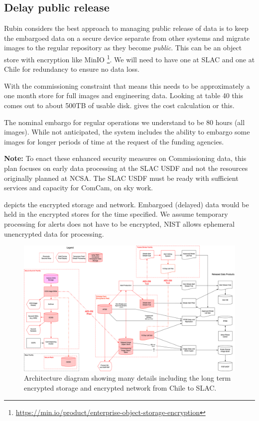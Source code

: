 
\subsection{Delay public release} \label{sec:3delay}

Rubin considers the best approach to managing public release of data is to keep the embargoed data on a secure device separate from other systems and migrate images to the regular repository as they become \emph{public}.
This can be an object store with encryption like MinIO \footnote{\url{ https://min.io/product/enterprise-object-storage-encryption}}.
We will need to have one at \gls{SLAC} and one at Chile for redundancy to ensure no data loss.

With the commissioning constraint that means this needs to be approximately a one month store  for full images and engineering data.
Looking at 
table 40 this comes out to about 500TB of usable disk.
 gives the cost calculation or this.

The nominal embargo for regular operations we understand to be 80 hours (all images).
While not anticipated, the system includes the ability to embargo some images for longer periods of  time at the request of the funding agencies.



{\bf Note:} To enact these enhanced security measures on \gls{Commissioning} data, this plan focuses on early data processing at the SLAC USDF and not the resources originally planned at NCSA. The SLAC USDF must be ready with sufficient services and capacity for ComCam, on sky work.

 depicts the encrypted storage and network. Embargoed (delayed) data would be held in the encrypted stores for the time specified.
We assume temporary processing for alerts does not have to be encrypted, \gls{NIST} allows ephemeral unencrypted data for processing.

\begin{figure}
\begin{centering}
\includegraphics[width=\textwidth]{Embargo_arch}
	\caption{ Architecture diagram showing many details including the long term encrypted storage and encrypted network from Chile to SLAC. \label{fig:arch}}
\end{centering}
\end{figure}
